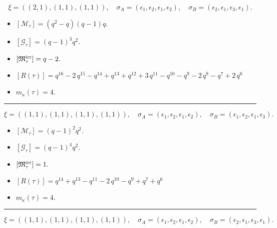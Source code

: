 \documentclass[10pt,a4paper]{amsart}
\begin{document}
$$\xi = ({(2, 1)}, {(1, 1)}, {(1, 1)}),\quad \sigma_A = ({{\epsilon_1, \epsilon_2}}, {{\epsilon_1}}, {{\epsilon_2}}),\quad \sigma_B = ({{\epsilon_2, \epsilon_1}}, {{\epsilon_3}}, {{\epsilon_1}}).$$

\begin{itemize}
 \item $[\mathcal{M}_{\tau}] = {\left(q^{2} - q\right)} {\left(q - 1\right)} q .$

 \item $[\mathcal{G}_{\tau}] = {\left(q - 1\right)}^{3} q^{2} .$

 \item $[{\frak M}_{\tau}^{\textrm{irr}}] = q - 2 .$

 \item $[R(\tau)] = q^{16} - 2 \, q^{15} - q^{14} + q^{13} + q^{12} + 3 \, q^{11} - q^{10} - q^{9} - 2 \, q^{8} - q^{7} + 2 \, q^{6} $

 \item $m_{\kappa}(\tau) = 4 .$

 \end{itemize}
\noindent\rule{8cm}{0.4pt}

$$\xi = ({(1, 1), (1, 1)}, {(1, 1)}, {(1, 1)}),\quad \sigma_A = ({{\epsilon_1}, {\epsilon_2}}, {{\epsilon_1}}, {{\epsilon_2}}),\quad \sigma_B = ({{\epsilon_1}, {\epsilon_2}}, {{\epsilon_1}}, {{\epsilon_3}}).$$

\begin{itemize}
 \item $[\mathcal{M}_{\tau}] = {\left(q - 1\right)}^{2} q^{2} .$

 \item $[\mathcal{G}_{\tau}] = {\left(q - 1\right)}^{4} q^{2} .$

 \item $[{\frak M}_{\tau}^{\textrm{irr}}] = 1 .$

 \item $[R(\tau)] = q^{14} + q^{13} - q^{11} - 2 \, q^{10} - q^{9} + q^{7} + q^{6} $

 \item $m_{\kappa}(\tau) = 4 .$

 \end{itemize}
\noindent\rule{8cm}{0.4pt}

$$\xi = ({(1, 1), (1, 1)}, {(1, 1)}, {(1, 1)}),\quad \sigma_A = ({{\epsilon_1}, {\epsilon_2}}, {{\epsilon_1}}, {{\epsilon_2}}),\quad \sigma_B = ({{\epsilon_2}, {\epsilon_1}}, {{\epsilon_3}}, {{\epsilon_1}}).$$
\end{document}
